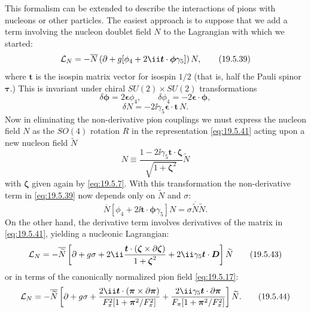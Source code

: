 This formalism can be extended to describe the interactions of pions with nucleons or other particles. The easiest approach is to suppose that we add a term involving the nucleon doublet field $N$ to the Lagrangian with which we started:
\begin{equation}
\mathcal L_N
=-\overline N\left(
\sl{\partial}
+g[\phi_4+2\ii\boldsymbol t\cdot\boldsymbol{\phi}\gamma_5]
\right)N,
\tag{19.5.39}\label{eq:19.5.39}
\end{equation}
where $\boldsymbol t$ is the isospin matrix vector for isospin $1/2$ (that is, half the Pauli spinor $\boldsymbol{\tau}$.) This is invariant under chiral $SU(2)\times SU(2)$ transformations
\begin{equation}
\delta\boldsymbol{\phi}=2\boldsymbol{\epsilon}\phi_4,
\qquad
\delta\phi_4=-2\boldsymbol{\epsilon}\cdot\boldsymbol{\phi},
\tag{19.5.40}\label{eq:19.5.40}
\end{equation}
\begin{equation}
\delta N=-2\ii\gamma_5\boldsymbol{\epsilon}\cdot\boldsymbol t\,N.
\tag{19.5.41}\label{eq:19.5.41}
\end{equation}
Now in eliminating the non-derivative pion couplings we must express the nucleon field $N$ as the $SO(4)$ rotation $R$ in the representation \eqref{eq:19.5.41} acting upon a new nucleon field $\widetilde N$
\begin{equation}
N\equiv
\frac{1-2\ii\gamma_5\boldsymbol t\cdot\boldsymbol{\zeta}}
{\sqrt{1+\boldsymbol{\zeta}^2}}\widetilde N
\tag{19.5.42}\label{eq:19.5.42}
\end{equation}
with $\boldsymbol{\zeta}$ given again by \eqref{eq:19.5.7}. With this transformation the non-derivative term in \eqref{eq:19.5.39} now depends only on $\widetilde N$ and $\sigma$:
\[
\overline N[\phi_4+2\ii\boldsymbol t\cdot\boldsymbol{\phi}\gamma_5]N
=\sigma\overline{\widetilde N}\widetilde N.
\]
On the other hand, the derivative term involves derivatives of the matrix in \eqref{eq:19.5.41}, yielding a nucleonic Lagrangian:
\begin{equation}
\mathcal L_N
=-\overline{\widetilde N}
\left[
\sl{\partial}+g\sigma
+2\ii\frac{\boldsymbol t\cdot
(\boldsymbol{\zeta}\times\sl{\partial}\boldsymbol{\zeta})}
{1+\boldsymbol{\zeta}^2}
+2\ii\gamma_5\boldsymbol t\cdot\sl{\boldsymbol D}
\right]\widetilde N
\tag{19.5.43}\label{eq:19.5.43}
\end{equation}
or in terms of the canonically normalized pion field \eqref{eq:19.5.17}:
\begin{equation}
\mathcal L_N
=-\overline{\widetilde N}
\left[
\sl{\partial}+g\sigma
+\frac{2\ii\boldsymbol t\cdot
(\boldsymbol{\pi}\times\sl{\partial}\boldsymbol{\pi})}
{F_\pi^2[1+\boldsymbol{\pi}^2/F_\pi^2]}
+\frac{2\ii\gamma_5\boldsymbol t\cdot
\sl{\partial}\boldsymbol{\pi}}
{F_\pi[1+\boldsymbol{\pi}^2/F_\pi^2]}
\right]\widetilde N.
\tag{19.5.44}\label{eq:19.5.44}
\end{equation}

